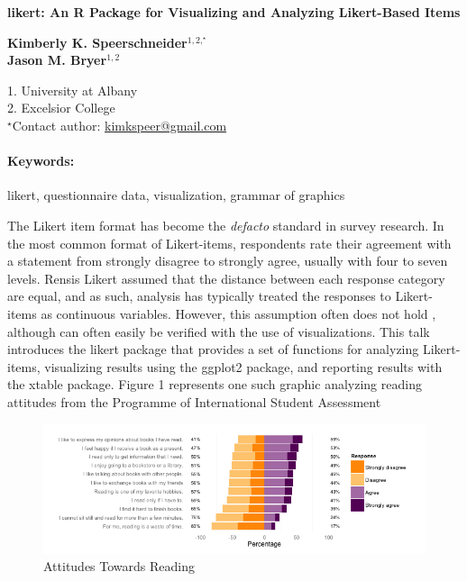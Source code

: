 \documentclass[11pt, a4paper]{article}
\newcommand{\pkg}[1]{{\normalfont\fontseries{b}\selectfont #1}}
\renewcommand{\title}[1]{\begin{center}{\bf \LARGE #1}\end{center}}
\newcommand{\keywords}{\paragraph{Keywords:}}
\begin{document}
\pagestyle{empty}

\title{\pkg{likert}: An R Package for Visualizing and Analyzing Likert-Based Items}

\begin{center}
  {\bf Kimberly K. Speerschneider$^{1,2,^\star}$}\\
  {\bf Jason M. Bryer$^{1,2}$}
\end{center}

\begin{affiliations}
1. University at Albany \\[-2pt]
2. Excelsior College \\[-2pt]
$^\star$Contact author: \href{mailto:kimkspeer@gmail.com}{kimkspeer@gmail.com}
\end{affiliations}

\keywords likert, questionnaire data, visualization, grammar of graphics

\vskip 0.8cm

The Likert \citep{Likert1932} item format has become the \textit{defacto} standard in survey research. In the most common format of Likert-items, respondents rate their agreement with a statement from strongly disagree to strongly agree, usually with four to seven levels. Rensis Likert assumed that the distance between each response category are equal, and as such, analysis has typically treated the responses to Likert-items as continuous variables. However, this assumption often does not hold \citep[see e.g.][]{Wakita2012}, although can often easily be verified with the use of visualizations. This talk introduces the \pkg{likert} package that provides a set of functions for analyzing Likert-items, visualizing results using the \pkg{ggplot2} \citep{ggplot2} package, and reporting results with the \pkg{xtable} \citep{xtable} package. Figure 1 represents one such graphic analyzing reading attitudes from the Programme of International Student Assessment \citep[PISA;][]{pisa}

\begin{figure}[h!]
\begin{center}
    \includegraphics[width=\textwidth]{likert-l28}
    \caption{Attitudes Towards Reading}
    \end{center}
    \label{likertplot}
\end{figure}



\end{document}
